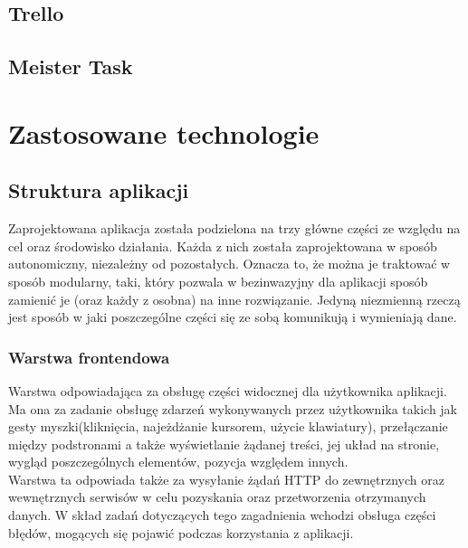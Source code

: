 \documentclass[eng,printmode]{mgr}
\begin{document}
\subsection{Trello}

\subsection{Meister Task}

\section{Zastosowane technologie}
\subsection{Struktura aplikacji}
Zaprojektowana aplikacja została podzielona na trzy główne części ze względu na cel oraz środowisko działania. Każda z nich została zaprojektowana w sposób autonomiczny, niezależny od pozostałych. Oznacza to, że można je traktować w sposób modularny, taki, który pozwala w bezinwazyjny dla aplikacji sposób zamienić je (oraz każdy z osobna) na inne rozwiązanie. Jedyną niezmienną rzeczą jest sposób w jaki poszczególne części się ze sobą komunikują i wymieniają dane. 
\subsubsection{Warstwa frontendowa}
Warstwa odpowiadająca za obsługę części widocznej dla użytkownika aplikacji. Ma ona za zadanie obsługę zdarzeń wykonywanych przez użytkownika takich jak gesty myszki(kliknięcia, najeżdżanie kursorem, użycie klawiatury), przełączanie między podstronami a także wyświetlanie żądanej treści, jej układ na stronie, wygląd poszczególnych elementów, pozycja względem innych.
\\
Warstwa ta odpowiada także za wysyłanie żądań HTTP do zewnętrznych oraz wewnętrznych serwisów w celu pozyskania oraz przetworzenia otrzymanych danych. W skład zadań dotyczących tego zagadnienia wchodzi obsługa części błędów, mogących się pojawić podczas korzystania z aplikacji.
\end{document}
